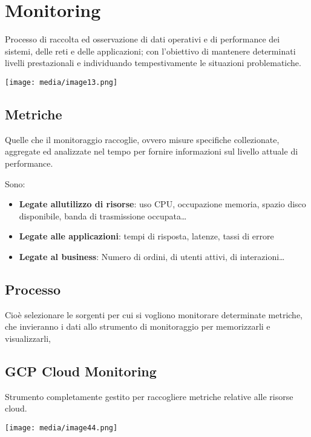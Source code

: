 \section{Monitoring}\label{monitoring}

Processo di raccolta ed osservazione di dati operativi e di performance
dei sistemi, delle reti e delle applicazioni; con l'obiettivo di
mantenere determinati livelli prestazionali e individuando
tempestivamente le situazioni problematiche.

\texttt{[image: media/image13.png]}

\subsection{Metriche}\label{metriche}

Quelle che il monitoraggio raccoglie, ovvero misure specifiche
collezionate, aggregate ed analizzate nel tempo per fornire informazioni
sul livello attuale di performance.

Sono:

\begin{itemize}
\item
  \textbf{Legate all\textquotesingle utilizzo di risorse}: uso CPU,
  occupazione memoria, spazio disco disponibile, banda di trasmissione
  occupata\ldots{}
\item
  \textbf{Legate alle applicazioni}: tempi di risposta, latenze, tassi
  di errore
\item
  \textbf{Legate al business}: Numero di ordini, di utenti attivi, di
  interazioni\ldots{}
\end{itemize}

\subsection{Processo}\label{processo}

Cioè selezionare le sorgenti per cui si vogliono monitorare determinate
metriche, che invieranno i dati allo strumento di monitoraggio per
memorizzarli e visualizzarli,

\subsection{GCP Cloud Monitoring}\label{gcp-cloud-monitoring}

Strumento completamente gestito per raccogliere metriche relative alle
risorse cloud.

\texttt{[image: media/image44.png]}

